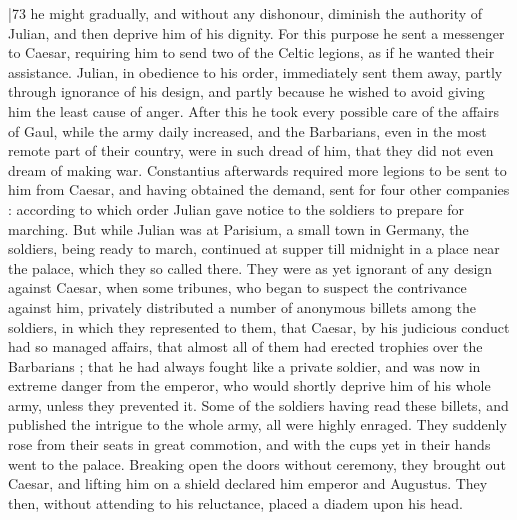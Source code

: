 |73 he might gradually, and without any dishonour, diminish the authority of Julian, and then deprive him of his dignity. For this purpose he sent a messenger to Caesar, requiring him to send two of the Celtic legions, as if he wanted their assistance. Julian, in obedience to his order, immediately sent them away, partly through ignorance of his design, and partly because he wished to avoid giving him the least cause of anger. After this he took every possible care of the affairs of Gaul, while the army daily increased, and the Barbarians, even in the most remote part of their country, were in such dread of him, that they did not even dream of making war. Constantius afterwards required more legions to be sent to him from Caesar, and having obtained the demand, sent for four other companies : according to which order Julian gave notice to the soldiers to prepare for marching. But while Julian was at Parisium, a small town in Germany, the soldiers, being ready to march, continued at supper till midnight in a place near the palace, which they so called there. They were as yet ignorant of any design against Caesar, when some tribunes, who began to suspect the contrivance against him, privately distributed a number of anonymous billets among the soldiers, in which they represented to them, that Caesar, by his judicious conduct had so managed affairs, that almost all of them had erected trophies over the Barbarians ; that he had always fought like a private soldier, and was now in extreme danger from the emperor, who would shortly deprive him of his whole army, unless they prevented it. Some of the soldiers having read these billets, and published the intrigue to the whole army, all were highly enraged. They suddenly rose from their seats in great commotion, and with the cups yet in their hands went to the palace. Breaking open the doors without ceremony, they brought out Caesar, and lifting him on a shield declared him emperor and Augustus. They then, without attending to his reluctance, placed a diadem upon his head.

